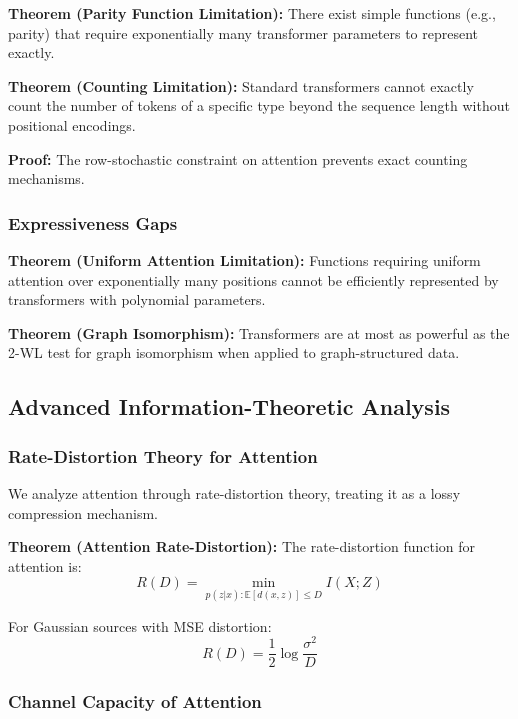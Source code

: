 \textbf{Theorem (Parity Function Limitation):} There exist simple functions (e.g., parity) that require exponentially many transformer parameters to represent exactly.

\textbf{Theorem (Counting Limitation):} Standard transformers cannot exactly count the number of tokens of a specific type beyond the sequence length without positional encodings.

\textbf{Proof:} The row-stochastic constraint on attention prevents exact counting mechanisms.

\subsubsection{Expressiveness Gaps}

\textbf{Theorem (Uniform Attention Limitation):} Functions requiring uniform attention over exponentially many positions cannot be efficiently represented by transformers with polynomial parameters.

\textbf{Theorem (Graph Isomorphism):} Transformers are at most as powerful as the 2-WL test for graph isomorphism when applied to graph-structured data.

\subsection{Advanced Information-Theoretic Analysis}

\subsubsection{Rate-Distortion Theory for Attention}

We analyze attention through rate-distortion theory, treating it as a lossy compression mechanism.

\textbf{Theorem (Attention Rate-Distortion):} The rate-distortion function for attention is:
\begin{equation}
R(D) = \min_{p(z|x): \mathbb{E}[d(x,z)] \leq D} I(X;Z)
\end{equation}

For Gaussian sources with MSE distortion:
\begin{equation}
R(D) = \frac{1}{2} \log \frac{\sigma^2}{D}
\end{equation}

\subsubsection{Channel Capacity of Attention}

